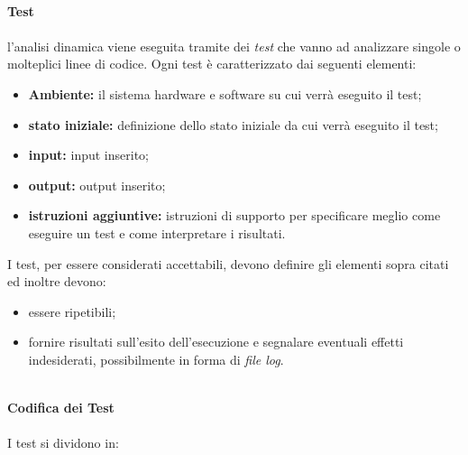 \mbox{}\\
\textbf{Test} \mbox{}\\ \mbox{}\\
l'analisi dinamica viene eseguita tramite dei \textit{test} che vanno ad analizzare singole o molteplici linee di codice. Ogni test è caratterizzato dai seguenti elementi:
\begin{itemize}
	\item \textbf{Ambiente: } il sistema hardware e software su cui verrà eseguito il test;
	\item \textbf{stato iniziale:} definizione dello stato iniziale da cui verrà eseguito il test;
	\item \textbf{input: } input inserito;
	\item \textbf{output: } output inserito;
	\item \textbf{istruzioni aggiuntive: } istruzioni di supporto per specificare meglio come eseguire un test e come interpretare i risultati.
\end{itemize}
I test, per essere considerati accettabili, devono definire gli elementi sopra citati ed inoltre devono:
\begin{itemize}
	\item essere ripetibili;
	\item fornire risultati sull'esito dell'esecuzione e segnalare eventuali effetti indesiderati, possibilmente in forma di \textit{file log}. 
\end{itemize}
\mbox{}\\
\textbf{Codifica dei Test} \mbox{}\\ \mbox{}\\
I test si dividono in:
